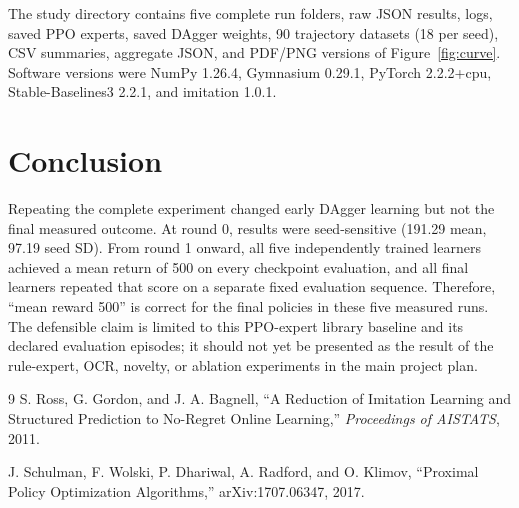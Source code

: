 \documentclass[11pt]{article}
\begin{document}
The study directory contains five complete run folders, raw JSON results, logs, saved PPO experts, saved DAgger weights, 90 trajectory datasets (18 per seed), CSV summaries, aggregate JSON, and PDF/PNG versions of Figure~\ref{fig:curve}. Software versions were NumPy 1.26.4, Gymnasium 0.29.1, PyTorch 2.2.2+cpu, Stable-Baselines3 2.2.1, and imitation 1.0.1.

\section{Conclusion}

Repeating the complete experiment changed early DAgger learning but not the final measured outcome. At round 0, results were seed-sensitive (191.29 mean, 97.19 seed SD). From round 1 onward, all five independently trained learners achieved a mean return of 500 on every checkpoint evaluation, and all final learners repeated that score on a separate fixed evaluation sequence. Therefore, ``mean reward 500'' is correct for the final policies in these five measured runs. The defensible claim is limited to this PPO-expert library baseline and its declared evaluation episodes; it should not yet be presented as the result of the rule-expert, OCR, novelty, or ablation experiments in the main project plan.

\begin{thebibliography}{9}
S. Ross, G. Gordon, and J. A. Bagnell,
``A Reduction of Imitation Learning and Structured Prediction to No-Regret Online Learning,''
\emph{Proceedings of AISTATS}, 2011.

J. Schulman, F. Wolski, P. Dhariwal, A. Radford, and O. Klimov,
``Proximal Policy Optimization Algorithms,'' arXiv:1707.06347, 2017.
\end{thebibliography}
\end{document}
